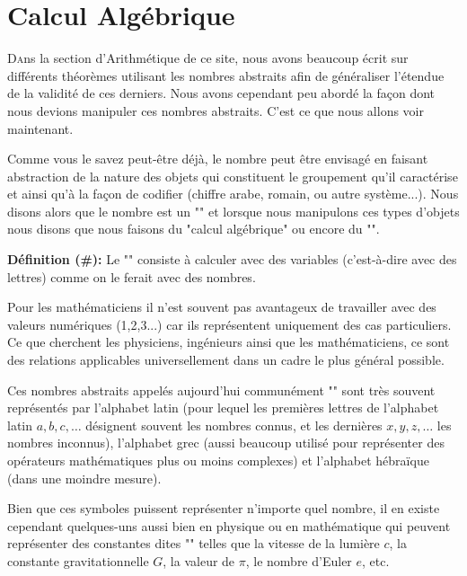 	\newpage
	\thispagestyle{empty}
	\mbox{}
	\section{Calcul Algébrique}\label{calculus}
	\lettrine[lines=4]{\color{BrickRed}D}ans la section d'Arithmétique de ce site, nous avons beaucoup écrit sur différents théorèmes utilisant les nombres abstraits afin de généraliser l'étendue de la validité de ces derniers. Nous avons cependant peu abordé la façon dont nous devions manipuler ces nombres abstraits. C'est ce que nous allons voir maintenant.
	
	Comme vous le savez peut-être déjà, le nombre peut être envisagé en faisant abstraction de la nature des objets qui constituent le groupement qu'il caractérise et ainsi qu'à la façon de codifier (chiffre arabe, romain, ou autre système...). Nous disons alors que le nombre est un "" et lorsque nous manipulons ces types d'objets nous disons que nous faisons du "calcul 	algébrique" ou encore du "".
	
	\textbf{Définition (\#\mydef):} Le "" consiste à calculer avec des variables (c'est-à-dire avec des lettres) comme on le ferait avec des nombres.
	
	Pour les mathématiciens il n'est souvent pas avantageux de travailler avec des valeurs numériques (1,2,3...) car ils représentent uniquement des cas particuliers. Ce que cherchent les physiciens, ingénieurs ainsi que les mathématiciens, ce sont des relations applicables universellement dans un cadre le plus général possible.
	
	Ces nombres abstraits appelés aujourd'hui communément "" sont très souvent représentés par l'alphabet latin (pour lequel les premières lettres de l'alphabet latin $a, b, c, \ldots$ désignent souvent les nombres connus, et les dernières $x, y, z, \ldots$ les nombres inconnus), l'alphabet grec (aussi beaucoup utilisé pour représenter des opérateurs mathématiques plus ou moins complexes) et l'alphabet hébraïque (dans une moindre mesure).
	
	Bien que ces symboles puissent représenter n'importe quel nombre, il en existe cependant quelques-uns aussi bien en physique ou en mathématique qui peuvent représenter des constantes dites "" telles que la vitesse de la lumière $c$, la constante gravitationnelle $G$, la valeur de $\pi$, le nombre d'Euler $e$, etc.

